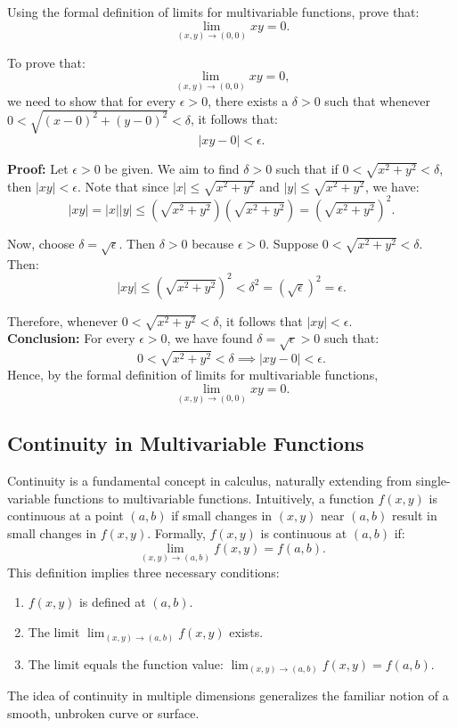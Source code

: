 \exampleline
\begin{example}
Using the formal definition of limits for multivariable functions, prove that:
\[
\lim_{(x, y) \to (0, 0)} x y = 0.
\]


\begin{solution}
To prove that:
\[
\lim_{(x, y) \to (0, 0)} x y = 0,
\]
we need to show that for every \( \epsilon > 0 \), there exists a \( \delta > 0 \) such that whenever \( 0 < \sqrt{(x - 0)^2 + (y - 0)^2} < \delta \), it follows that:
\[
|x y - 0| < \epsilon.
\]

\noindent \textbf{Proof:} Let \( \epsilon > 0 \) be given. We aim to find \( \delta > 0 \) such that if \( 0 < \sqrt{x^2 + y^2} < \delta \), then \( |x y| < \epsilon \). Note that since \( |x| \leq \sqrt{x^2 + y^2} \) and \( |y| \leq \sqrt{x^2 + y^2} \), we have:
\[
|x y| = |x||y| \leq \left( \sqrt{x^2 + y^2} \right) \left( \sqrt{x^2 + y^2} \right) = \left( \sqrt{x^2 + y^2} \right)^2.
\]

\noindent Now, choose \( \delta = \sqrt{\epsilon} \). Then \( \delta > 0 \) because \( \epsilon > 0 \). Suppose \( 0 < \sqrt{x^2 + y^2} < \delta \). Then:
\[
|x y| \leq \left( \sqrt{x^2 + y^2} \right)^2 < \delta^2 = (\sqrt{\epsilon})^2 = \epsilon.
\]

\noindent  Therefore, whenever \( 0 < \sqrt{x^2 + y^2} < \delta \), it follows that \( |x y| < \epsilon \). \\

\noindent  \textbf{Conclusion:} For every \( \epsilon > 0 \), we have found \( \delta = \sqrt{\epsilon} > 0 \) such that:
\[
0 < \sqrt{x^2 + y^2} < \delta \implies |x y - 0| < \epsilon.
\]
\noindent  Hence, by the formal definition of limits for multivariable functions,
\[
\lim_{(x, y) \to (0, 0)} x y = 0.
\]
\end{solution}
\end{example}
\exampleline


\subsection*{Continuity in Multivariable Functions} 

\noindent Continuity is a fundamental concept in calculus, naturally extending from single-variable functions to multivariable functions. Intuitively, a function \( f(x, y) \) is continuous at a point \( (a, b) \) if small changes in \( (x, y) \) near \( (a, b) \) result in small changes in \( f(x, y) \). Formally, \( f(x, y) \) is continuous at \( (a, b) \) if:
\[
\lim_{(x, y) \to (a, b)} f(x, y) = f(a, b).
\]
This definition implies three necessary conditions:
\begin{enumerate}
    \item \( f(x, y) \) is defined at \( (a, b) \).
    \item The limit \( \lim_{(x, y) \to (a, b)} f(x, y) \) exists.
    \item The limit equals the function value: \( \lim_{(x, y) \to (a, b)} f(x, y) = f(a, b) \).
\end{enumerate}
The idea of continuity in multiple dimensions generalizes the familiar notion of a smooth, unbroken curve or surface.

